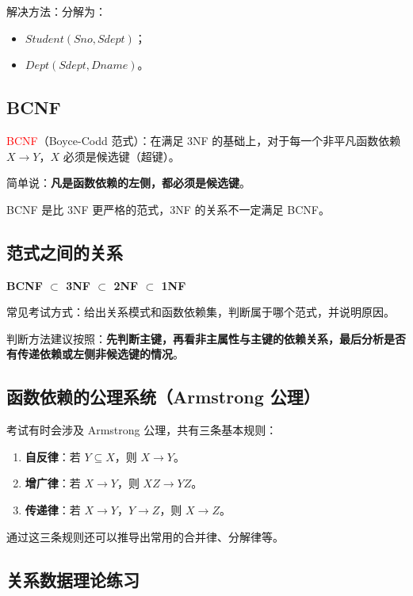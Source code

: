 \documentclass{../../note}
\begin{document}
解决方法：分解为：
\begin{itemize}
  \item $Student(Sno, Sdept)$；
  \item $Dept(Sdept, Dname)$。
\end{itemize}

\subsection{BCNF}

\textcolor{red}{BCNF}（Boyce-Codd 范式）：在满足 3NF 的基础上，对于每一个非平凡函数依赖 $X \to Y$，$X$ 必须是候选键（超键）。

简单说：\textbf{凡是函数依赖的左侧，都必须是候选键}。

BCNF 是比 3NF 更严格的范式，3NF 的关系不一定满足 BCNF。

\subsection{范式之间的关系}

\begin{center}
\textbf{BCNF $\subset$ 3NF $\subset$ 2NF $\subset$ 1NF}
\end{center}

常见考试方式：给出关系模式和函数依赖集，判断属于哪个范式，并说明原因。

判断方法建议按照：\textbf{先判断主键，再看非主属性与主键的依赖关系，最后分析是否有传递依赖或左侧非候选键的情况}。

\subsection{函数依赖的公理系统（Armstrong 公理）}

考试有时会涉及 Armstrong 公理，共有三条基本规则：

\begin{enumerate}
  \item \textbf{自反律}：若 $Y \subseteq X$，则 $X \to Y$。
  \item \textbf{增广律}：若 $X \to Y$，则 $XZ \to YZ$。
  \item \textbf{传递律}：若 $X \to Y$，$Y \to Z$，则 $X \to Z$。
\end{enumerate}

通过这三条规则还可以推导出常用的合并律、分解律等。

\subsection{关系数据理论练习}
\end{document}
